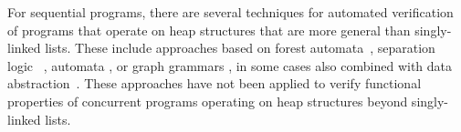 For sequential programs,
there are several techniques for automated verification of programs that operate
on heap structures that are more general than singly-linked lists.
These include approaches based on forest automata~\cite{forester12,boxes13,Quy:atva13:journal}, separation logic~ \cite{InvaderCAV08,dudka13},
automata \cite{artmc12}, or graph grammars \cite{juggrnaut10}, in some
cases also combined with data
abstraction~\cite{Loginov:AbstrRefViaInductLearning:05}.
These approaches have not been applied to verify functional properties of
concurrent programs operating on heap structures beyond singly-linked lists.

